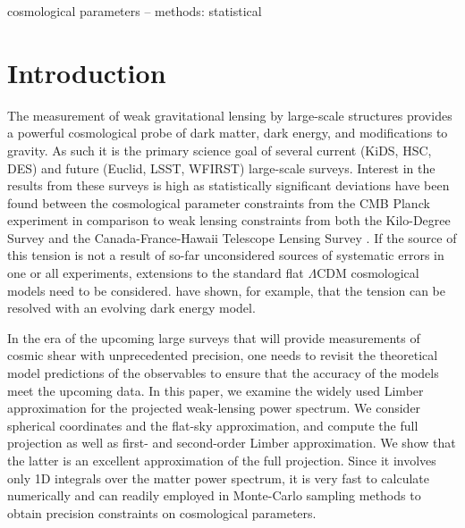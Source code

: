 \documentclass[fleqn,usenatbib]{mnras} %
\begin{document}
\begin{keywords}
cosmological parameters -- methods: statistical
\end{keywords}



\section{Introduction}
\label{sec:intro}

The measurement of weak gravitational lensing by large-scale structures
provides a powerful cosmological probe of dark matter, dark energy, and
modifications to gravity.  As such it is the primary science goal of several
current (KiDS, HSC, DES) and future (Euclid, LSST, WFIRST) large-scale surveys.
Interest in the results from these surveys is high as statistically significant
deviations have been found between the cosmological parameter constraints from
the CMB Planck experiment \citep{2015arXiv150201589P} in comparison to weak
lensing constraints from both the Kilo-Degree Survey \citep[KiDS;][]{KiDS-450}
and the Canada-France-Hawaii Telescope Lensing Survey
\citep[CFHTLenS;][]{joudaki/etal:2016}.  If the source of this tension is not
a result of so-far unconsidered sources of systematic errors in one or all
experiments, extensions to the standard flat $\Lambda$CDM cosmological models
need to be considered. \citet{joudaki/etal:2017} have shown, for example, that
the tension can be resolved with an evolving dark energy model.

In the era of the upcoming large surveys that will provide measurements of
cosmic shear with unprecedented precision, one needs to revisit the theoretical
model predictions of the observables to ensure that the accuracy of the
models meet the upcoming data. In this paper, we examine the widely used Limber
approximation for the projected weak-lensing power spectrum. We consider
spherical coordinates and the flat-sky approximation, and compute the full
projection as well as first- and second-order Limber approximation. We show
that the latter is an excellent approximation of the full projection. Since it
involves only 1D integrals over the matter power spectrum, it is very fast to
calculate numerically and can readily employed in Monte-Carlo sampling methods
to obtain precision constraints on cosmological parameters.
\end{document}
